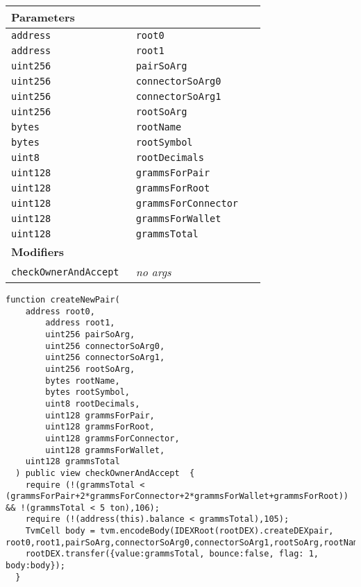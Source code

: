 \ifsoltables
\noindent\begin{tabular}{|l|l|p{5cm}|}\hline
\multicolumn{3}{|l|}{\bf Parameters}\\\hline
\tt address & \tt root0 &\\\hline
\tt address & \tt root1 &\\\hline
\tt uint256 & \tt pairSoArg &\\\hline
\tt uint256 & \tt connectorSoArg0 &\\\hline
\tt uint256 & \tt connectorSoArg1 &\\\hline
\tt uint256 & \tt rootSoArg &\\\hline
\tt bytes & \tt rootName &\\\hline
\tt bytes & \tt rootSymbol &\\\hline
\tt uint8 & \tt rootDecimals &\\\hline
\tt uint128 & \tt grammsForPair &\\\hline
\tt uint128 & \tt grammsForRoot &\\\hline
\tt uint128 & \tt grammsForConnector &\\\hline
\tt uint128 & \tt grammsForWallet &\\\hline
\tt uint128 & \tt grammsTotal &\\\hline
\multicolumn{3}{|l|}{\bf Modifiers}\\\hline
\tt checkOwnerAndAccept & {\em no args} &\\\hline
\end{tabular}
\fi

\vspace{2cm}

\begin{lstlisting}[firstnumber=356]
  function createNewPair(
    address root0,
		address root1,
		uint256 pairSoArg,
		uint256 connectorSoArg0,
		uint256 connectorSoArg1,
		uint256 rootSoArg,
		bytes rootName,
		bytes rootSymbol,
		uint8 rootDecimals,
		uint128 grammsForPair,
		uint128 grammsForRoot,
		uint128 grammsForConnector,
		uint128 grammsForWallet,
    uint128 grammsTotal
  ) public view checkOwnerAndAccept  {
    require (!(grammsTotal < (grammsForPair+2*grammsForConnector+2*grammsForWallet+grammsForRoot)) && !(grammsTotal < 5 ton),106);
    require (!(address(this).balance < grammsTotal),105);
    TvmCell body = tvm.encodeBody(IDEXRoot(rootDEX).createDEXpair, root0,root1,pairSoArg,connectorSoArg0,connectorSoArg1,rootSoArg,rootName,rootSymbol,rootDecimals,grammsForPair,grammsForRoot,grammsForConnector,grammsForWallet);
    rootDEX.transfer({value:grammsTotal, bounce:false, flag: 1, body:body});
  }
\end{lstlisting}

